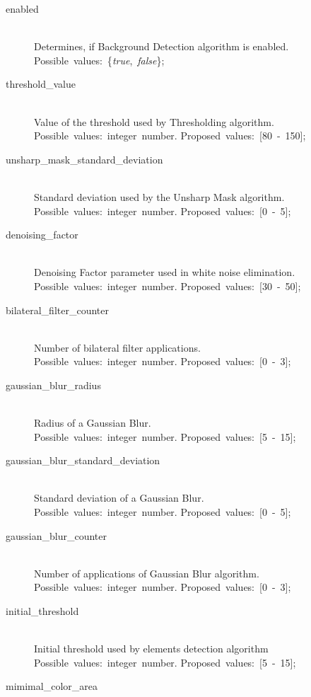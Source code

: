 \documentclass[a4paper,onecolumn,oneside,12pt]{memoir}
\begin{document}
\begin{description}
  \item[enabled] \hfill \\
    Determines, if Background Detection algorithm is enabled. \\
    Possible~values:~\{\textit{true},~\textit{false}\};
  \item[threshold\_value] \hfill \\
    Value of the threshold used by Thresholding algorithm. \\
    Possible~values:~integer~number. Proposed~values:~[80~-~150];
  \item[unsharp\_mask\_standard\_deviation] \hfill \\
    Standard deviation used by the Unsharp Mask algorithm. \\
    Possible~values:~integer~number. Proposed~values:~[0~-~5];
  \item[denoising\_factor] \hfill \\
    Denoising Factor parameter used in white noise elimination. \\
    Possible~values:~integer~number. Proposed~values:~[30~-~50];
  \item[bilateral\_filter\_counter] \hfill \\
    Number of bilateral filter applications. \\
    Possible~values:~integer~number. Proposed~values:~[0~-~3];
  \item[gaussian\_blur\_radius] \hfill \\
    Radius of a Gaussian Blur. \\
    Possible~values:~integer~number. Proposed~values:~[5~-~15];
  \item[gaussian\_blur\_standard\_deviation] \hfill \\
    Standard deviation of a Gaussian Blur. \\
    Possible~values:~integer~number. Proposed~values:~[0~-~5];
  \item[gaussian\_blur\_counter] \hfill \\
    Number of applications of Gaussian Blur algorithm. \\
    Possible~values:~integer~number. Proposed~values:~[0~-~3];
  \item[initial\_threshold] \hfill \\
    Initial threshold used by elements detection algorithm \\
    Possible~values:~integer~number. Proposed~values:~[5~-~15];
  \item[mimimal\_color\_area] \hfill \\

\end{description}
\end{document}

